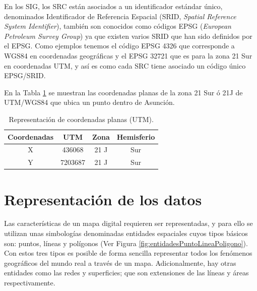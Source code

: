 En los SIG, los SRC están asociados a un identificador estándar único, denominados Identificador de Referencia Espacial (SRID, \textit{Spatial Reference System Identifier}), también son conocidos como códigos EPSG (\textit{European Petroleum Survey Group}) ya que existen varios SRID que han sido definidos por el EPSG. Como ejemplos tenemos el código EPSG 4326 que corresponde a WGS84 en coordenadas geográficas y el EPSG 32721 que es para la zona 21 Sur en coordenadas UTM, y así es como cada SRC tiene asociado un código único EPSG/SRID.

En la Tabla \ref{table:coordenadasPlanas} se muestran las coordenadas planas de la zona 21 Sur ó 21J de UTM/WGS84 que ubica un punto dentro de Asunción.

\begin{table}[H]
\caption{Representación de coordenadas planas (UTM).}
\centering
\begin{tabular}{cccc}
\hline
Coordenadas & UTM     & Zona & Hemisferio \\ \hline
X           & 436068  & 21 J & Sur        \\
Y           & 7203687 & 21 J & Sur        \\ \hline
\end{tabular}
\label{table:coordenadasPlanas}
\end{table}



\section{Representación de los datos}

Las características de un mapa digital requieren ser representadas, y para ello se utilizan unas simbologías denominadas entidades espaciales cuyos tipos básicos son: puntos, líneas y polígonos (Ver Figura \ref{fig:entidadesPuntoLineaPoligono}). Con estos tres tipos es posible de forma sencilla representar todos los fenómenos geográficos del mundo real a través de un mapa. Adicionalmente, hay otras entidades como las redes y superficies; que son extensiones de las líneas y áreas respectivamente.

